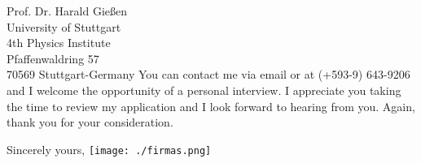 \documentclass{letter}
\begin{document}
\begin{letter}{Prof. Dr. Harald Gießen \\
University of Stuttgart\\
4th Physics Institute\\
Pfaffenwaldring 57\\
70569 Stuttgart-Germany}
You can contact me via email or at (+593-9) 643-9206 and I welcome
the opportunity of a personal interview. I appreciate
you taking the time to review my application and I look forward to
hearing from you. Again, thank you for your consideration. 

\closing{Sincerely yours,\vspace{0.5cm}
\texttt{[image: ./firmas.png]}
}

\end{letter}
\end{document}
